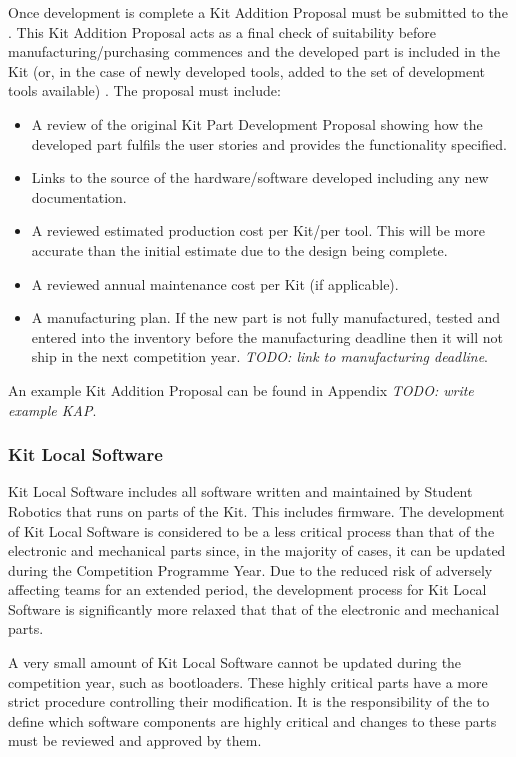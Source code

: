 \begin{draft}
Once development is complete a Kit Addition Proposal must be submitted to the . This Kit Addition Proposal acts as a final check of suitability before manufacturing/purchasing commences and the developed part is included in the Kit (or, in the case of newly developed tools, added to the set of development tools available) . The proposal must include:
\begin{itemize}
  \item A review of the original Kit Part Development Proposal showing how the developed part fulfils the user stories and provides the functionality specified.
  \item Links to the source of the hardware/software developed including any new documentation.
  \item A reviewed estimated production cost per Kit/per tool. This will be more accurate than the initial estimate due to the design being complete.
  \item A reviewed annual maintenance cost per Kit (if applicable).
  \item A manufacturing plan. If the new part is not fully manufactured, tested and entered into the inventory before the manufacturing deadline then it will not ship in the next competition year. \emph{TODO: link to manufacturing deadline}.
\end{itemize}

An example Kit Addition Proposal can be found in Appendix \emph{TODO: write example KAP}.

\subsubsection{Kit Local Software}
Kit Local Software includes all software written and maintained by Student Robotics that runs on parts of the Kit. This includes firmware. The development of Kit Local Software is considered to be a less critical process than that of the electronic and mechanical parts since, in the majority of cases, it can be updated during the Competition Programme Year. Due to the reduced risk of adversely affecting teams for an extended period, the development process for Kit Local Software is significantly more relaxed that that of the electronic and mechanical parts.

A very small amount of Kit Local Software cannot be updated during the competition year, such as bootloaders. These highly critical parts have a more strict procedure controlling their modification. It is the responsibility of the  to define which software components are highly critical and changes to these parts must be reviewed and approved by them.


\end{draft}
